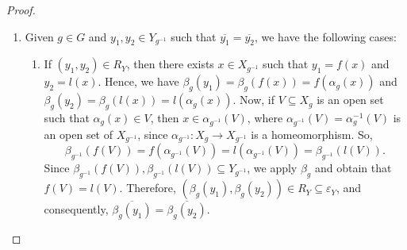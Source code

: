 \documentclass[sn-mathphys-num]{sn-jnl}%
\theoremstyle{thmstyleone}%
\theoremstyle{thmstyletwo}%
\theoremstyle{thmstylethree}%
\begin{document}
\begin{proof}
\begin{enumerate}
\begin{enumerate}
\begin{enumerate}
            \item If $(z, y') \in R_Y$ and $(y', y) \in \Delta_Y$, then $y = y'$ and there exists $g \in G$ such that $z, y' \in Y_g$. Furthermore, there exists $x \in X_g$ with $z = f(x)$, $y' = l(x)$. Thus, $l(x) \in U$. Since $l$ is continuous, there exists $W_x \subseteq X$ open with $x \in W_x$ and $l(W_x) \subseteq U$. So,  $z = f(x) \in f(W_x \cap X_g) = l(W_x \cap X_g) \subseteq l(W_x) \subseteq U$ because $(z, y') \in R_Y$.
            \item If $(z, y'), (y', y) \in R_Y^{-1}$, then $(y, y'), (y', z) \in R_Y$ and the proof follows similarly as in case i.
            \item If $(z, y') \in R_Y^{-1}$ and $(y', y) \in \Delta_Y$, then $y = y'$ and $(y', z) \in R_Y$, and the proof is analogous to case iii.
            \item If $(z, y'), (y', y) \in \Delta_Y$, then $z = y' = y \in U$.
            \item If $(z, y') \in R_Y^{-1}$ and $(y', y) \in R_Y$, then it is similar to the case i.
            \item If $(z, y') \in \Delta_Y$ and $(y', y) \in  R_Y$, then it is similar to the case iii.
            \item If $(z, y') \in \Delta_Y$ and $(y', y) \in R_Y^{-1}$, then it is similar to the case iii.
        \end{enumerate}
    \end{enumerate}
\item Given $g \in G$ and $y_1, y_2 \in Y_{g^{-1}}$ such that $\overline{y_1} = \overline{y_2}$, we have the following cases:
      \begin{enumerate}
        \item If $ (y_1 , y_2 ) \in R_Y$, then there exists $ x \in X_{g^{-1}}$ such that $ y_1 = f(x) $ and $ y_2 = l(x) $. Hence, we have $ \beta_g( y_1) = \beta_g(f(x)) = f(\alpha_g( x)) $ and $ \beta_g( y_2) = \beta_g( l(x) ) = l(\alpha_g( x))$. Now, if $V \subseteq X_g$ is an open set such that $\alpha_g(x) \in V$, then $x \in \alpha_{g^{-1}}(V)$, where $\alpha_{g^{-1}}(V) = \alpha_g^{-1}(V)$ is an open set of $X_{g^{-1}}$, since $\alpha_{g^{-1}} : X_{g} \to X_{g^{-1}}$ is a homeomorphism. So, 
$$\beta_{g^{-1}}(f(V)) = f(\alpha_{g^{-1}}(V)) = l(\alpha_{g^{-1}}(V)) = \beta_{g^{-1}}(l(V)).$$
            Since $\beta_{g^{-1}}(f(V)), \beta_{g^{-1}}(l(V)) \subseteq Y_{g^{-1}}$, we apply $\beta_{g}$ and obtain that $f(V) = l(V)$. Therefore,  $(\beta_g(y_1), \beta_g(y_2)) \in R_Y \subseteq \varepsilon_Y$, and consequently, $\overline{\beta_g(y_1)} = \overline{\beta_g( y_2)}.$

\end{enumerate}
\end{enumerate}
\end{proof}
\end{document}
